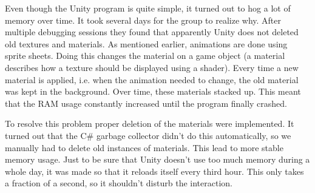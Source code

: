 Even though the Unity program is quite simple, it turned out to hog a lot of memory over time. It took several days for the group to realize why. After multiple debugging sessions they found that apparently Unity does not deleted old textures and materials. As mentioned earlier, animations are done using sprite sheets. Doing this changes the material on a game object (a material describes how a texture should be displayed using a shader). Every time a new material is applied, i.e. when the animation needed to change, the old material was kept in the background. Over time, these materials stacked up. This meant that the RAM usage constantly increased until the program finally crashed.

To resolve this problem proper deletion of the materials were implemented. It turned out that the {C\#} garbage collector didn't do this automatically, so we manually had to delete old instances of materials. This lead to more stable memory usage. Just to be sure that Unity doesn't use too much memory during a whole day, it was made so that it reloads itself every third hour. This only takes a fraction of a second, so it shouldn't disturb the interaction.
